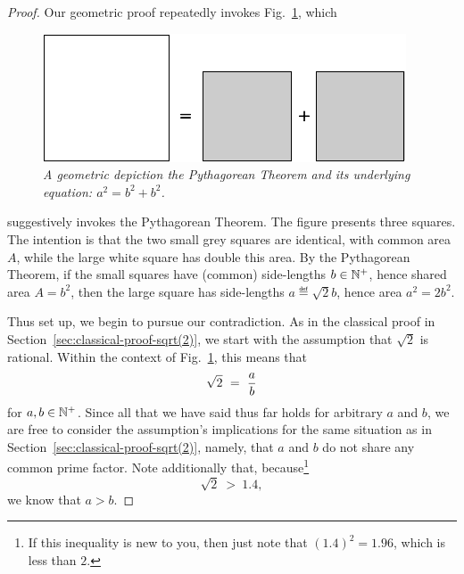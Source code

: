 \begin{proof}
Our geometric proof repeatedly invokes Fig.~\ref{fig:irrationality1}, which
\begin{figure}[htb]
\begin{center}
       \includegraphics[scale=0.4]{FiguresArithmetic/sqrt2initial}
\caption{{\it A geometric depiction the Pythagorean Theorem and its
    underlying equation: $a^2 = b^2 + b^2$.}
\label{fig:irrationality1}}
\end{center}
\end{figure}
suggestively invokes the Pythagorean Theorem.  The figure presents
three squares.  The intention is that the two small grey squares are
identical, with common area $A$, while the large white square has
double this area.  By the Pythagorean Theorem, if the small squares
have (common) side-lengths $b \in \mathbb{N}^+$, hence shared area $A = b^2$,
then the large square has side-lengths $a \eqdef \sqrt{2}b$, hence
area $a^2 = 2 b^2$.

Thus set up, we begin to pursue our contradiction.  As in the
classical proof in Section~\ref{sec:classical-proof-sqrt(2)}, we start
with the assumption that $\sqrt{2}$ is rational.  Within the context
of Fig.~\ref{fig:irrationality1}, this means that
\[ \sqrt{2} \ = \ {a \over b} \]
for $a, b \in \mathbb{N}^+$.  Since all that we have said thus far holds for
arbitrary $a$ and $b$, we are free to consider the assumption's
implications for the same situation as in
Section~\ref{sec:classical-proof-sqrt(2)}, namely, that $a$ and $b$ do
not share any common prime factor.  Note additionally that,
because\footnote{If this inequality is new to you, then just note that
  $(1.4)^2 = 1.96$, which is less than $2$.}
\[ \sqrt{2} \ > \ 1.4, \]
we know that $a > b$.
\medskip

\noindent {}
\medskip


\end{proof}
